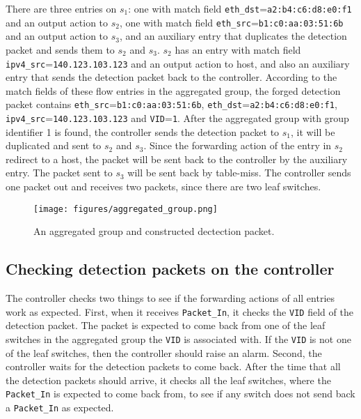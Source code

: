 There are three entries on $s_1$: one with match field \texttt{eth\_dst}=\texttt{a2:b4:c6:d8:e0:f1} and an output action to $s_2$, one with match field \texttt{eth\_src}=\texttt{b1:c0:aa:03:51:6b} and an output action to $s_3$, and an auxiliary entry that duplicates the detection packet and sends them to $s_2$ and $s_3$. $s_2$ has an entry with match field \texttt{ipv4\_src}=\texttt{140.123.103.123} and an output action to host, and also an auxiliary entry that sends the detection packet back to the controller. According to the match fields of these flow entries in the aggregated group, the forged detection packet contains \texttt{eth\_src}=\texttt{b1:c0:aa:03:51:6b}, \texttt{eth\_dst}=\texttt{a2:b4:c6:d8:e0:f1}, \texttt{ipv4\_src}=\texttt{140.123.103.123} and \texttt{VID}=\texttt{1}. After the aggregated group with group identifier 1 is found, the controller sends the detection packet to $s_1$, it will be duplicated and sent to $s_2$ and $s_3$. Since the forwarding action of the entry in $s_2$ redirect to a host, the packet will be sent back to the controller by the auxiliary entry. The packet sent to $s_3$ will be sent back by table-miss. The controller sends one packet out and receives two packets, since there are two leaf switches.

\begin{figure}[H]
\begin{center}
\texttt{[image: figures/aggregated\_group.png]}
\end{center}
\caption{An aggregated group and constructed dectection packet.}
\label{aggregated_group}
\end{figure}

\subsection{Checking detection packets on the controller}
The controller checks two things to see if the forwarding actions of all entries work as expected. First, when it receives \texttt{Packet\_In}, it checks the \texttt{VID} field of the detection packet. The packet is expected to come back from one of the leaf switches in the aggregated group the \texttt{VID} is associated with. If the \texttt{VID} is not one of the leaf switches, then the controller should raise an alarm. Second, the controller waits for the detection packets to come back. After the time that all the detection packets should arrive, it checks all the leaf switches, where the \texttt{Packet\_In} is expected to come back from, to see if any switch does not send back a \texttt{Packet\_In} as expected. 

